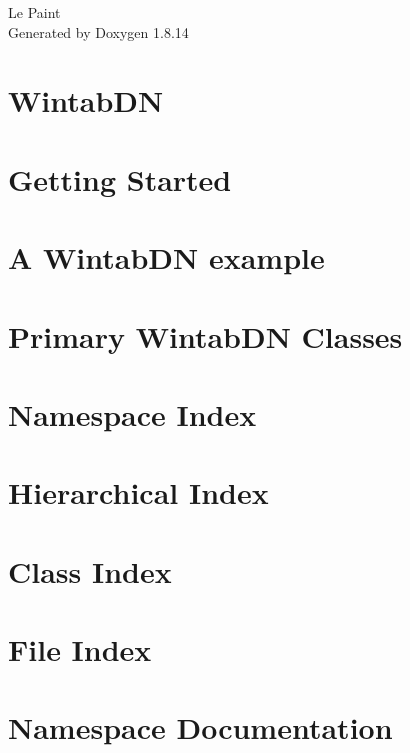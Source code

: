 \documentclass[twoside]{book}
\newcommand{\+}{\discretionary{\mbox{\scriptsize$\hookleftarrow$}}{}{}}
\newcommand{\clearemptydoublepage}{%
  \newpage{\pagestyle{empty}\cleardoublepage}%
}
\begin{document}
\hypersetup{pageanchor=false,
             bookmarksnumbered=true,
             pdfencoding=unicode
            }
\begin{titlepage}
\vspace*{7cm}
\begin{center}%
{\Large Le Paint }\\
\vspace*{1cm}
{\large Generated by Doxygen 1.8.14}\\
\end{center}
\end{titlepage}
\clearemptydoublepage
{}
\tableofcontents
\clearemptydoublepage
{}
\hypersetup{pageanchor=true}

\chapter{Wintab\+DN}
\label{index}\hypertarget{index}{}
\chapter{Getting Started}
\label{page1}

\chapter{A Wintab\+DN example}
\label{page2}

\chapter{Primary Wintab\+DN Classes}
\label{page3}

\chapter{Namespace Index}

\chapter{Hierarchical Index}

\chapter{Class Index}

\chapter{File Index}

\chapter{Namespace Documentation}


\end{document}

